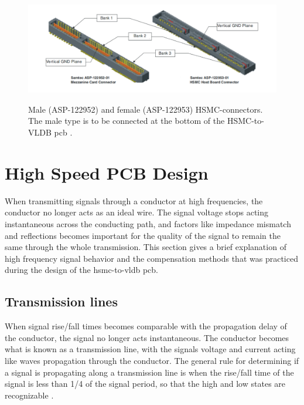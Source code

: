 \documentclass[main.tex]{subfiles}
\begin{document}
\begin{figure}[ht] %
\includegraphics[width=\linewidth]{../img/HSMC_52_53_hsmcspec}  \\[0.1 cm]
\caption{Male (ASP-122952) and female (ASP-122953) HSMC-connectors. The male type is to be connected at the bottom of the HSMC-to-VLDB \gls{pcb} \cite[Figure 2-1]{altera_hsmc09}.}
\label{fig:hsmc}
\end{figure}

\section{High Speed PCB Design}

When transmitting signals through a conductor at high frequencies, the conductor no longer acts as an ideal wire. The signal voltage stops acting instantaneous across the conducting path, and factors like impedance mismatch and reflections becomes important for the quality of the signal to remain the same through the whole transmission. This section gives a brief explanation of high frequency signal behavior and the compensation methods that was practiced during the design of the \gls{hsmc}-to-\gls{vldb} \gls{pcb}.

\subsection{Transmission lines}

When signal rise/fall times becomes comparable with the propagation delay of the conductor, the signal no longer acts instantaneous. The conductor becomes what is known as a transmission line, with the signals voltage and current acting like waves propagation through the conductor. 
The general rule for determining if a signal is propagating along a transmission line is when the rise/fall time of the signal is less than 1/4 of the signal period, so that the high and low states are recognizable \cite{weste11}.
\end{document}
